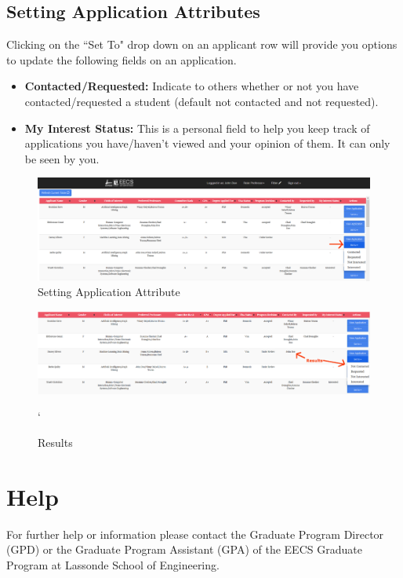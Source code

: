 \documentclass[fontsize=12pt,paper=letter,twoside]{scrartcl}
\begin{document}
\subsection{Setting Application Attributes}
Clicking on the ``Set To" drop down on an applicant row will provide you options to update the following fields on an application.
\begin{itemize}
\item \textbf{Contacted/Requested:} Indicate to others whether or not you have contacted/requested a student (default not contacted and not requested).
\item \textbf{My Interest Status:} This is a personal field to help you keep track of applications you have/haven't viewed and your opinion of them. It can only be seen by you.
\end{itemize}

\begin{figure}[!htb]
\begin{center}
\includegraphics[width=.99\textwidth]{images/prof/set_attribute.png}
\end{center}
\caption{Setting Application Attribute}
\label{fig:prof/set_attribute}
\end{figure}

\begin{figure}[!htb]
\begin{center}
\includegraphics[width=.99\textwidth]{images/prof/set_attribute2.png}
\end{center}`
\caption{Results}
\label{fig:prof/set_attribute_results}
\end{figure}

\clearpage
\newpage
\section{Help}
For further help or information please contact the Graduate Program Director (GPD) or the Graduate Program Assistant (GPA) of the EECS Graduate Program at Lassonde School of Engineering.\\
\end{document}
